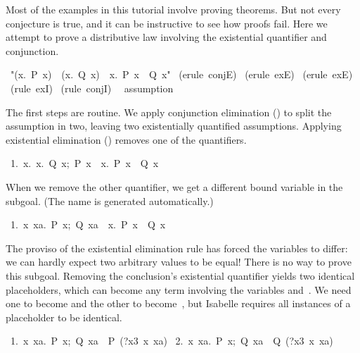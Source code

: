 Most of the examples in this tutorial involve proving theorems.  But not every 
conjecture is true, and it can be instructive to see how  
proofs fail. Here we attempt to prove a distributive law involving 
the existential quantifier and conjunction. 
\begin{isabelle}
\ "({\isasymexists}x.\ P\ x)\ \isasymand\ ({\isasymexists}x.\ Q\ x)\ \isasymLongrightarrow\ {\isasymexists}x.\ P\ x\ \isasymand\ Q\ x"\isanewline
{}\ (erule\ conjE)\isanewline
{}\ (erule\ exE)\isanewline
{}\ (erule\ exE)\isanewline
{}\ (rule\ exI)\isanewline
{}\ (rule\ conjI)\isanewline
\ \ assumption\isanewline
{}
\end{isabelle}
The first steps are  routine.  We apply conjunction elimination () to split the assumption  in two, leaving two existentially quantified
assumptions.  Applying existential elimination  () removes one of
the quantifiers. 
\begin{isabelle}
\ 1.\ {\isasymAnd}x.\ \isasymlbrakk{\isasymexists}x.\ Q\ x;\ P\ x\isasymrbrakk\ \isasymLongrightarrow\ {\isasymexists}x.\ P\ x\ \isasymand\ Q\ x
\end{isabelle}
%
When we remove the other quantifier, we get a different bound 
variable in the subgoal.  (The name  is generated automatically.)
\begin{isabelle}
\ 1.\ {\isasymAnd}x\ xa.\ {\isasymlbrakk}P\ x;\ Q\ xa\isasymrbrakk\
\isasymLongrightarrow\ {\isasymexists}x.\ P\ x\ \isasymand\ Q\ x
\end{isabelle}
The proviso of the existential elimination rule has forced the variables to
differ: we can hardly expect two arbitrary values to be equal!  There is
no way to prove this subgoal.  Removing the
conclusion's existential quantifier yields two
identical placeholders, which can become  any term involving the variables 
and~.  We need one to become \bigisa{x}
and the other to become~\bigisa{xa}, but Isabelle requires all instances of a
placeholder to be identical. 
\begin{isabelle}
\ 1.\ {\isasymAnd}x\ xa.\ {\isasymlbrakk}P\ x;\ Q\ xa\isasymrbrakk\
\isasymLongrightarrow\ P\ (?x3\ x\ xa)\isanewline
\ 2.\ {\isasymAnd}x\ xa.\ {\isasymlbrakk}P\ x;\ Q\ xa\isasymrbrakk\ \isasymLongrightarrow\ Q\ (?x3\ x\ xa)
\end{isabelle}

